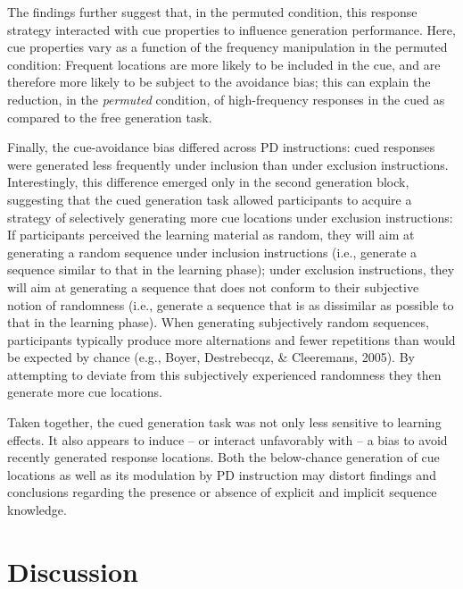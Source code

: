 \documentclass[
  english,
  man]{apa6}
\begin{document}
The findings further suggest that, in the permuted condition, this response strategy interacted with cue properties to influence generation performance.
Here, cue properties vary as a function of the frequency manipulation in the permuted condition:
Frequent locations are more likely to be included in the cue, and are therefore more likely to be subject to the avoidance bias;
this can explain the reduction, in the \emph{permuted} condition, of high-frequency responses in the cued as compared to the free generation task.

Finally, the cue-avoidance bias differed across PD instructions: cued responses were generated less frequently under inclusion than under exclusion instructions.
Interestingly, this difference emerged only in the second generation block, suggesting that the cued generation task allowed participants to acquire a strategy of selectively generating more cue locations under exclusion instructions:
If participants perceived the learning material as random, they will aim at generating a random sequence under inclusion instructions (i.e., generate a sequence similar to that in the learning phase);
under exclusion instructions, they will aim at generating a sequence that does not conform to their subjective notion of randomness (i.e., generate a sequence that is as dissimilar as possible to that in the learning phase).
When generating subjectively random sequences, participants typically produce more alternations and fewer repetitions than would be expected by chance (e.g., Boyer, Destrebecqz, \& Cleeremans, 2005).
By attempting to deviate from this subjectively experienced randomness they then generate more cue locations.

Taken together, the cued generation task was not only less sensitive to learning effects.
It also appears to induce -- or interact unfavorably with -- a bias to avoid recently generated response locations.
Both the below-chance generation of cue locations as well as its modulation by PD instruction may distort findings and conclusions regarding the presence or absence of explicit and implicit sequence knowledge.

\hypertarget{discussion}{%
\section{Discussion}\label{discussion}}
\end{document}
